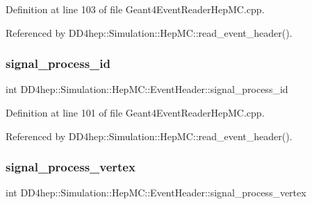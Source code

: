 Definition at line 103 of file Geant4\+Event\+Reader\+Hep\+M\+C.\+cpp.



Referenced by D\+D4hep\+::\+Simulation\+::\+Hep\+M\+C\+::read\+\_\+event\+\_\+header().

\hypertarget{class_d_d4hep_1_1_simulation_1_1_hep_m_c_1_1_event_header_a339a52131b423a70529a66bae821906b}{}\label{class_d_d4hep_1_1_simulation_1_1_hep_m_c_1_1_event_header_a339a52131b423a70529a66bae821906b} 
\subsubsection{\texorpdfstring{signal\+\_\+process\+\_\+id}{signal\_process\_id}}
{\footnotesize\ttfamily int D\+D4hep\+::\+Simulation\+::\+Hep\+M\+C\+::\+Event\+Header\+::signal\+\_\+process\+\_\+id}



Definition at line 101 of file Geant4\+Event\+Reader\+Hep\+M\+C.\+cpp.



Referenced by D\+D4hep\+::\+Simulation\+::\+Hep\+M\+C\+::read\+\_\+event\+\_\+header().

\hypertarget{class_d_d4hep_1_1_simulation_1_1_hep_m_c_1_1_event_header_a22408536166a5457c2380e3a06c3ae0c}{}\label{class_d_d4hep_1_1_simulation_1_1_hep_m_c_1_1_event_header_a22408536166a5457c2380e3a06c3ae0c} 
\subsubsection{\texorpdfstring{signal\+\_\+process\+\_\+vertex}{signal\_process\_vertex}}
{\footnotesize\ttfamily int D\+D4hep\+::\+Simulation\+::\+Hep\+M\+C\+::\+Event\+Header\+::signal\+\_\+process\+\_\+vertex}



